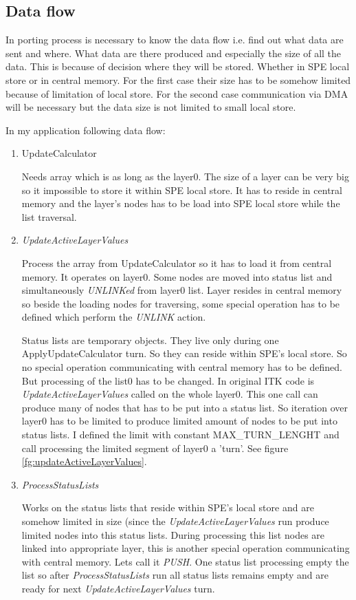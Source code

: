 \subsection{Data flow}

In porting process is necessary to know the data flow i.e. find out what data are sent and where.
What data are there produced and especially the size of all the data.
This is because of decision where they will be stored.
Whether in SPE local store or in central memory.
For the first case their size has to be somehow limited because of limitation of local store.
For the second case communication via DMA will be necessary but the data size is not limited to small local store.

In my application following data flow:
\begin{enumerate}
\item UpdateCalculator
\par
Needs array which is as long as the layer0.
The size of a layer can be very big so it impossible to store it within SPE local store.
It has to reside in central memory and the layer's nodes has to be load into SPE local store while the list traversal.

\item \emph{UpdateActiveLayerValues}
\par
Process the array from UpdateCalculator so it has to load it from central memory.
It operates on layer0.
Some nodes are moved into status list and simultaneously \emph{UNLINKed} from layer0 list.
Layer resides in central memory so beside the loading nodes for traversing, some special operation has to be defined which perform the \emph{UNLINK} action.
\par
Status lists are temporary objects. They live only during one ApplyUpdateCalculator turn.
So they can reside within SPE's local store.
So no special operation communicating with central memory has to be defined.
But processing of the list0 has to be changed.
In original ITK code is \emph{UpdateActiveLayerValues} called on the whole layer0.
This one call can produce many of nodes that has to be put into a status list.
So iteration over layer0 has to be limited to produce limited amount of nodes to be put into status lists.
I defined the limit with constant MAX\_TURN\_LENGHT and call processing the limited segment of layer0 a 'turn'.
See figure \ref{fg:updateActiveLayerValues}.

\item \emph{ProcessStatusLists}
\par
Works on the status lists that reside within SPE's local store and are somehow limited in size (since the \emph{UpdateActiveLayerValues} run produce limited nodes into this status lists.
During processing this list nodes are linked into appropriate layer, this is another special operation communicating with central memory.
Lets call it \emph{PUSH}.
One status list processing empty the list so after \emph{ProcessStatusLists} run all status lists remains empty and are ready for next \emph{UpdateActiveLayerValues} turn.


\end{enumerate}
